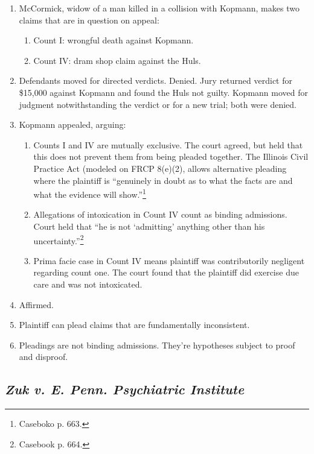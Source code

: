\begin{enumerate}
    \item McCormick, widow of a man killed in a collision with Kopmann, makes two claims that are in question on appeal:
    \begin{enumerate}
        \item Count I: wrongful death against Kopmann.
        \item Count IV: dram shop claim against the Huls.
    \end{enumerate}
    \item Defendants moved for directed verdicts. Denied. Jury returned verdict for \$15,000 against Kopmann and found the Huls not guilty. Kopmann moved for judgment notwithstanding the verdict or for a new trial; both were denied. 
    \item Kopmann appealed, arguing:
    \begin{enumerate}
        \item Counts I and IV are mutually exclusive. The court agreed, but held that this does not prevent them from being pleaded together. The Illinois Civil Practice Act (modeled on FRCP 8(e)(2), allows alternative pleading where the plaintiff is ``genuinely in doubt as to what the facts are and what the evidence will show.''\footnote{Caseboko p. 663.}
        \item Allegations of intoxication in Count IV count as binding admissions. Court held that ``he is not `admitting' anything other than his uncertainty.''\footnote{Casebook p. 664.}
        \item Prima facie case in Count IV means plaintiff was contributorily negligent regarding count one. The court found that the plaintiff did exercise due care and was not intoxicated.
    \end{enumerate}
    \item Affirmed.
    \item Plaintiff can plead claims that are fundamentally inconsistent.
    \item Pleadings are not binding admissions. They're hypotheses subject to proof and disproof.
\end{enumerate}

\subsection{\emph{Zuk v. E. Penn. Psychiatric Institute}}


